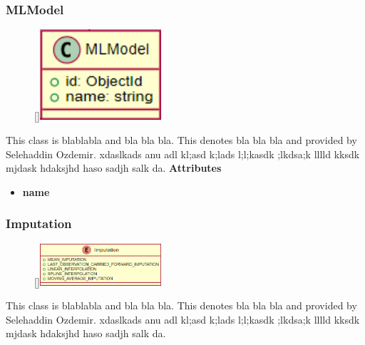 \subsubsection{MLModel}
\begin{figure}
    \raisebox{0pt}[\dimexpr{}\baselineskip\relax]{\includegraphics[width=4.5cm]{classes/model-management/4.png}}
\end{figure} 
\par
This class is blablabla and bla bla bla. This denotes bla bla bla and provided by Selehaddin Ozdemir. xdaslkads anu adl kl;asd k;lads l;l;kasdk ;lkdsa;k lllld kksdk mjdask hdaksjhd haso sadjh salk da.
\newline
\newline
\textbf{Attributes}
\begin{itemize}
    \item \textbf{name}
\end{itemize}

\subsubsection{Imputation}
\begin{figure}
    \raisebox{0pt}[\dimexpr{}\baselineskip\relax]{\includegraphics[width=4.5cm]{classes/model-management/5.png}}
\end{figure} 
\par
This class is blablabla and bla bla bla. This denotes bla bla bla and provided by Selehaddin Ozdemir. xdaslkads anu adl kl;asd k;lads l;l;kasdk ;lkdsa;k lllld kksdk mjdask hdaksjhd haso sadjh salk da.
\newline
\newline

